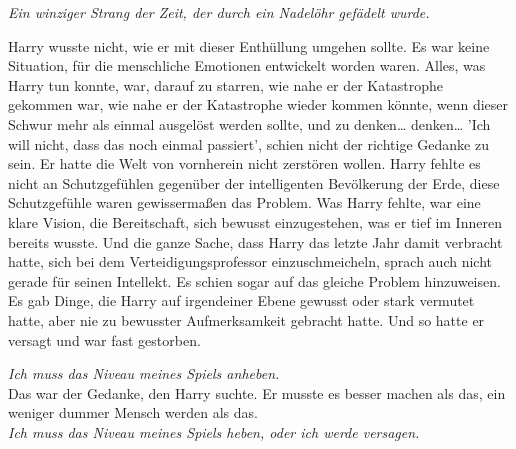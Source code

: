 {\emph{Ein winziger Strang der Zeit, der durch ein Nadelöhr gefädelt wurde.}

Harry wusste nicht, wie er mit dieser Enthüllung umgehen sollte. Es war keine Situation, für die menschliche Emotionen entwickelt worden waren. Alles, was Harry tun konnte, war, darauf zu starren, wie nahe er der Katastrophe gekommen war, wie nahe er der Katastrophe wieder kommen könnte, wenn dieser Schwur mehr als einmal ausgelöst werden sollte, und zu denken… denken… 'Ich will nicht, dass das noch einmal passiert', schien nicht der richtige Gedanke zu sein. Er hatte die Welt von vornherein nicht zerstören wollen. Harry fehlte es nicht an Schutzgefühlen gegenüber der intelligenten Bevölkerung der Erde, diese Schutzgefühle waren gewissermaßen das Problem. Was Harry fehlte, war eine klare Vision, die Bereitschaft, sich bewusst einzugestehen, was er tief im Inneren bereits wusste. Und die ganze Sache, dass Harry das letzte Jahr damit verbracht hatte, sich bei dem Verteidigungsprofessor einzuschmeicheln, sprach auch nicht gerade für seinen Intellekt. Es schien sogar auf das gleiche Problem hinzuweisen. Es gab Dinge, die Harry auf irgendeiner Ebene gewusst oder stark vermutet hatte, aber nie zu bewusster Aufmerksamkeit gebracht hatte. Und so hatte er versagt und war fast gestorben.

\emph{Ich muss das Niveau meines Spiels anheben.}\\ Das war der Gedanke, den Harry suchte. Er musste es besser machen als das, ein weniger dummer Mensch werden als das.\\ \emph{Ich muss das Niveau meines Spiels heben, oder ich werde versagen.}

}
